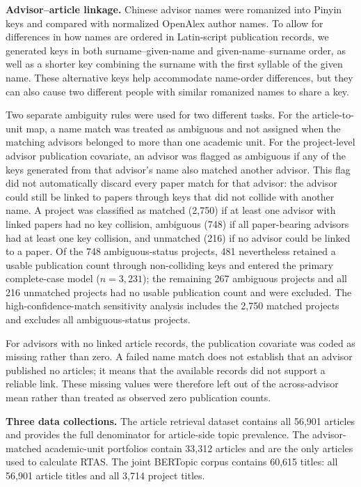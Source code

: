 \documentclass[pdflatex,sn-apa]{sn-jnl}
\begin{document}
\textbf{Advisor--article linkage.} Chinese advisor names were romanized into Pinyin keys and compared with normalized OpenAlex author names. To allow for differences in how names are ordered in Latin-script publication records, we generated keys in both surname--given-name and given-name--surname order, as well as a shorter key combining the surname with the first syllable of the given name. These alternative keys help accommodate name-order differences, but they can also cause two different people with similar romanized names to share a key.

Two separate ambiguity rules were used for two different tasks. For the article-to-unit map, a name match was treated as ambiguous and not assigned when the matching advisors belonged to more than one academic unit. For the project-level advisor publication covariate, an advisor was flagged as ambiguous if any of the keys generated from that advisor's name also matched another advisor. This flag did not automatically discard every paper match for that advisor: the advisor could still be linked to papers through keys that did not collide with another name. A project was classified as matched (2,750) if at least one advisor with linked papers had no key collision, ambiguous (748) if all paper-bearing advisors had at least one key collision, and unmatched (216) if no advisor could be linked to a paper. Of the 748 ambiguous-status projects, 481 nevertheless retained a usable publication count through non-colliding keys and entered the primary complete-case model ($n=3{,}231$); the remaining 267 ambiguous projects and all 216 unmatched projects had no usable publication count and were excluded. The high-confidence-match sensitivity analysis includes the 2,750 matched projects and excludes all ambiguous-status projects.

For advisors with no linked article records, the publication covariate was coded as missing rather than zero. A failed name match does not establish that an advisor published no articles; it means that the available records did not support a reliable link. These missing values were therefore left out of the across-advisor mean rather than treated as observed zero publication counts.

\textbf{Three data collections.} The article retrieval dataset contains all 56,901 articles and provides the full denominator for article-side topic prevalence. The advisor-matched academic-unit portfolios contain 33,312 articles and are the only articles used to calculate RTAS. The joint BERTopic corpus contains 60,615 titles: all 56,901 article titles and all 3,714 project titles.
\end{document}
